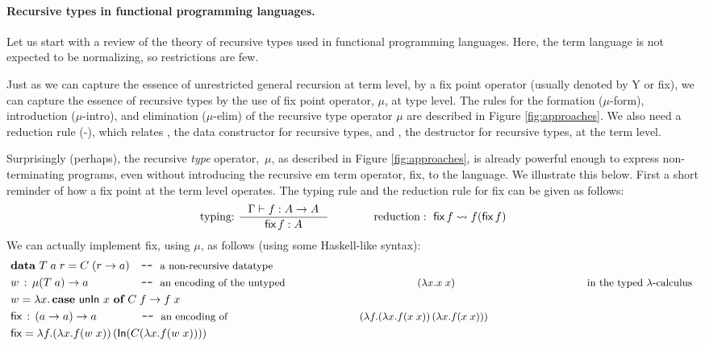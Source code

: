 \paragraph{Recursive types in functional programming languages.}
Let us start with a review of the theory of recursive types used
in functional programming languages. Here, the term
language is not expected to be normalizing, so restrictions are few.

Just as we can capture the essence of unrestricted general recursion at term
level, by a fix point operator (usually denoted by \textsf{Y} or \textsf{fix}),
we can capture the essence of recursive types by the
use of fix point operator, $\mu$, at type level. 
The rules for the formation {\small($\mu$-form)},
introduction {\small($\mu$-intro)}, and elimination {\small($\mu$-elim)} of
the recursive type operator $\mu$ are described in Figure \ref{fig:approaches}.
We also need a reduction rule {\small(\unIn-\In)}, which relates \In,
the data constructor for recursive types, and \unIn, the destructor for
recursive types, at the term level.

Surprisingly (perhaps), the recursive {\em type} operator,\ $\mu$, as described in
Figure \ref{fig:approaches}, is already powerful enough to express 
non-terminating programs, even without introducing the recursive {em term}
operator, \textsf{fix}, to the language. We illustrate this below. First a 
short reminder of how a fix point at the term level operates. The typing rule
and the reduction rule for \textsf{fix} can be given as follows:
\[ \text{typing:}~ \inference{\Gamma |- f : A -> A}{\textsf{fix}\,f : A}
 \qquad\qquad
   \text{reduction}:~ \textsf{fix}\,f \rightsquigarrow f(\textsf{fix}\,f)
\]
We can actually implement \textsf{fix}, using $\mu$, as follows
(using some Haskell-like syntax):
\begin{align*}
& \textbf{data}~T\;a\;r = C\;(r -> a) \quad
          \texttt{-}\texttt{-}~\text{\small a non-recursive datatype} \\
& w \,:\, \mu(T\;a) -> a ~~ \qquad \qquad
          \texttt{-}\texttt{-}~\text{\small an encoding of the untyped
                                     $(\lambda x.x\;x)$
                                     in the typed $\lambda$-calculus}~ \\
& w = \lambda x . \,\textbf{case}~\textsf{unIn}~x~\textbf{of}~C\;f -> f\;x \\
& \textsf{fix} \,:\, (a -> a) -> a \qquad \qquad
          \texttt{-}\texttt{-}~\text{\small an encoding of 
                                     $(\lambda f.(\lambda x.f(x\;x))\,
                                                 (\lambda x.f(x\;x)))$} \\
& \textsf{fix} = \lambda f. (\lambda x. f (w\;x))\,(\textsf{In}(C(\lambda x. f (w\;x))))
\end{align*}

